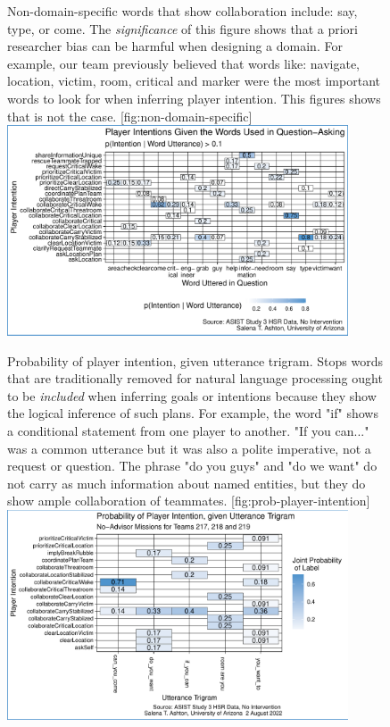 \begin{figure}
    \centering
    \begin{sidecaption}{%
        Non-domain-specific words that show collaboration include: say, type, or
        come. The \emph{significance} of this figure shows that a priori researcher
        bias can be harmful when designing a domain. For example, our team
        previously believed that words like: navigate, location, victim, room,
        critical and marker were the most important words to look for when
        inferring player intention. This figures shows that is not the case.
    }[fig:non-domain-specific]
    \includegraphics[width=0.9\textwidth]{../images/QuestionUtterances_Link_STA.pdf}
    \end{sidecaption}
\end{figure}


\begin{figure}
    \begin{sidecaption}{%
        Probability of player intention, given utterance trigram. Stops words
        that are traditionally removed for natural language processing ought to
        be \emph{included} when inferring goals or intentions because they show
        the logical inference of such plans. For example, the word "if" shows a
        conditional statement from one player to another. "If you can..." was a
        common utterance but it was also a polite imperative, not a request or
        question. The phrase "do you guys" and "do we want" do not carry as
        much information about named entities, but they do show ample
        collaboration of teammates.
    }[fig:prob-player-intention]
    \includegraphics[width=0.9\textwidth]{../images/FINAL_1_trigram_Utterances_STA.pdf}
\end{sidecaption}
\end{figure}

